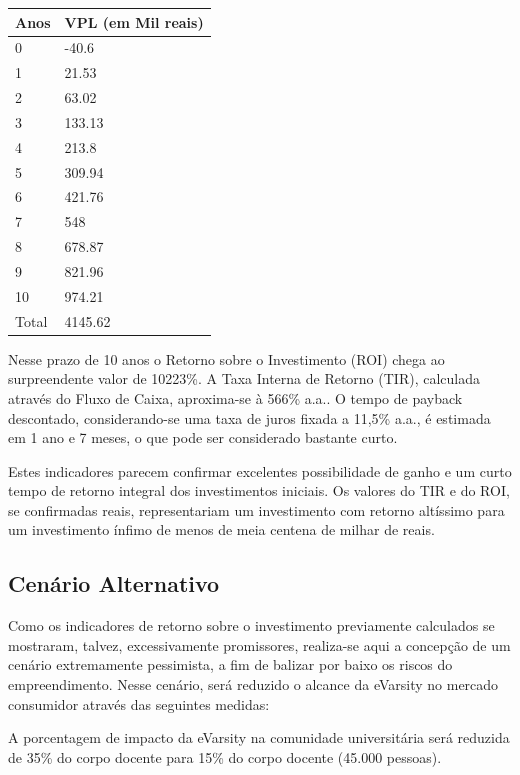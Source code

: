 \documentclass[a4paper, 12pt]{paper}
\begin{document}
	\begin{table}[ht]
				\centering
		\begin{tabular}{p{3cm}p{5cm}}
	\hline
	\cellcolor{gray}Anos &\cellcolor{gray}VPL (em Mil reais) \\ \hline
	0 & -40.6 \\ \hline
	1 & 21.53 \\ \hline
	2 & 63.02 \\ \hline
	3 & 133.13 \\ \hline
	4 & 213.8 \\ \hline
	5 & 309.94 \\ \hline
	6 & 421.76 \\ \hline
	7 & 548 \\ \hline
	8 & 678.87 \\ \hline
	9 & 821.96 \\ \hline
	10 & 974.21 \\ \hline
	Total & 4145.62 \\ \hline
		\end{tabular}
	\end{table}

Nesse prazo de 10 anos o Retorno sobre o Investimento (ROI) chega ao surpreendente valor de 10223\%. A Taxa Interna de Retorno (TIR), calculada através do Fluxo de Caixa, aproxima-se à 566\% a.a.. O tempo de payback descontado, considerando-se uma taxa de juros fixada a 11,5\% a.a., é estimada em 1 ano e 7 meses, o que pode ser considerado bastante curto.

Estes indicadores parecem confirmar excelentes possibilidade de ganho e um curto tempo de retorno integral dos investimentos iniciais. Os valores do TIR e do ROI, se confirmadas reais, representariam um investimento com retorno altíssimo para um investimento ínfimo de menos de meia centena de milhar de reais.
\subsection{Cenário Alternativo}
Como os indicadores de retorno sobre o investimento previamente calculados se mostraram, talvez, excessivamente promissores, realiza-se aqui a concepção de um cenário extremamente pessimista, a fim de balizar por baixo os riscos do empreendimento. Nesse cenário, será reduzido o alcance da eVarsity no mercado consumidor através das seguintes medidas:

A porcentagem de impacto da eVarsity na comunidade universitária será reduzida de 35\% do corpo docente para 15\% do corpo docente (45.000 pessoas).
\end{document}
